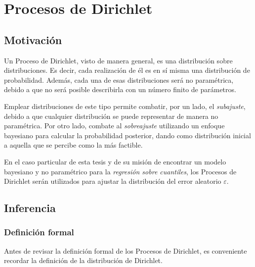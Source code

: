 \chapter[Procesos de Dirichlet]{Procesos de Dirichlet\raisebox{.3\baselineskip}{\normalsize\footnotemark}}

\section{Motivaci\'on}
Un Proceso de Dirichlet, visto de manera general, es una distribuci\'on sobre distribuciones. Es decir, cada realizaci\'on de él es en sí misma una distribuci\'on de probabilidad. Adem\'as, cada una de esas distribuciones ser\'a no param\'etrica, debido a que no ser\'a posible describirla con un n\'umero finito de par\'ametros.

Emplear distribuciones de este tipo permite combatir, por un lado, el \textit{subajuste}, debido a que cualquier distribuci\'on se puede representar de manera no param\'etrica. Por otro lado, combate al \textit{sobreajuste} utilizando un enfoque bayesiano para calcular la probabilidad posterior, dando como distribuci\'on inicial a aquella que se percibe como la m\'as factible.

En el caso particular de esta tesis y de su misi\'on de encontrar un modelo bayesiano y no param\'etrico para la \textit{regresi\'on sobre cuantiles}, los Procesos de Dirichlet ser\'an utilizados para ajustar la distribuci\'on del error aleatorio $\varepsilon$.


\section{Inferencia}

\subsection{Definici\'on formal}

Antes de revisar la definici\'on formal de los Procesos de Dirichlet, es conveniente recordar la definici\'on de la distribuci\'on de Dirichlet.

